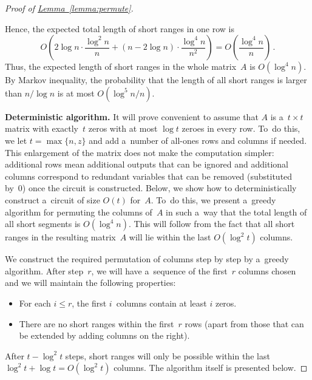 \documentclass[11pt]{article}
\numberwithin{equation}{section}
\theoremstyle{definition}
\theoremstyle{plain}
\newcommand{\expref}[2]{\hyperref[#2]{#1~\ref{#2}}}
\theoremstyle{plain}\newtheorem{observation}[theorem]{Observation}
\begin{document}
\begin{proof}[Proof of {\expref{Lemma}{lemma:permute}}]
\begin{enumerate}
    \end{enumerate}
    Hence, the expected total length of short ranges in one row is
    \[O\left( 2\log n \cdot \frac{\log^2 n}{n} + (n-2\log n) \cdot \frac{\log^4 n}{n^2}\right)=O\left(\frac{\log^4 n}{n}\right) \, .\]
    Thus, the expected length of short ranges in the whole
    matrix~$A$ is $O(\log^4n)$. By Markov inequality, the probability that
    the length of all short ranges is larger than $n/\log n$ is
    at most $O(\log^5 n/n)$.

    \textbf{Deterministic algorithm.}
    It will prove convenient to assume that $A$ is a~$t \times t$ matrix with
    exactly~$t$ zeros with at most $\log t$ zeroes in every row. To~do this, we let
    $t=\max\{n, z\}$ and add a~number of all-ones rows and columns if needed. This
    enlargement of the matrix does not make the computation simpler: additional rows
    mean additional outputs that can be ignored and additional columns correspond to
    redundant variables that can be removed (substituted by~0) once the circuit is
    constructed. Below, we show how to deterministically construct a~circuit of size
    $O(t)$ for~$A$. To~do this, we present a~greedy algorithm for permuting the
    columns of~$A$ in such a~way that the total length of all short segments
    is $O(\log^4n)$. This will follow from the fact that all short ranges in the
    resulting matrix~$A$ will lie within the last $O(\log^2 t)$ columns.

    We construct the required permutation of columns step by step by a~greedy
    algorithm. After step~$r$, we will have a~sequence of the first~$r$ columns
    chosen and we will maintain the following properties:
    \begin{itemize}
        \item For each $i \leq r$, the first $i$~columns contain at least $i$ zeros.
        \item There are no short ranges within the first~$r$ rows (apart from those
        that can be extended by adding columns on the right).
    \end{itemize}

    After $t - \log^2 t$ steps, short ranges will only be possible within the last
    $\log^2 t + \log t = O(\log^2 t)$ columns. The algorithm itself is presented
    below.


\end{proof}
\end{document}
